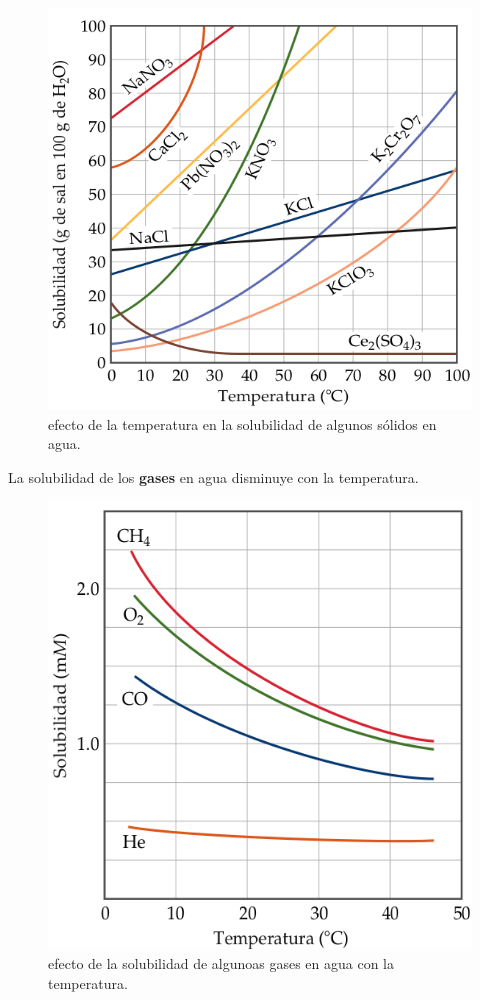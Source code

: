 \documentclass[]{article}
\begin{document}
\begin{figure}[H]
\center
\includegraphics[scale=0.3]{foto1.png}
\caption{efecto de la temperatura en la solubilidad de algunos sólidos en agua.}
\end{figure}

La solubilidad de los \textbf{gases} en agua disminuye con la temperatura.

\begin{figure}[h]
\center
\includegraphics[scale=0.3]{foto2.png}
\caption{efecto de la solubilidad de algunoas gases en agua con la temperatura.}
\end{figure}
\end{document}

